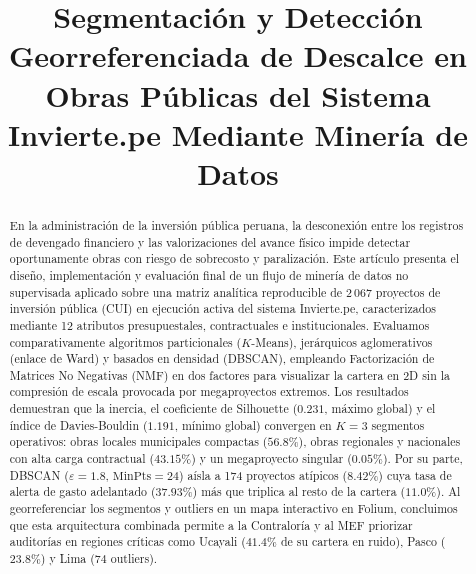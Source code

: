 \documentclass[conference]{IEEEtran}
\begin{document}
\title{Segmentaci\'on y Detecci\'on Georreferenciada de Descalce en Obras P\'ublicas del Sistema Invierte.pe Mediante Miner\'ia de Datos}

\author{
}

\maketitle

\begin{abstract}
En la administraci\'on de la inversi\'on p\'ublica peruana, la desconexi\'on entre los registros de devengado financiero y las valorizaciones del avance f\'isico impide detectar oportunamente obras con riesgo de sobrecosto y paralizaci\'on. Este art\'iculo presenta el dise\~no, implementaci\'on y evaluaci\'on final de un flujo de miner\'ia de datos no supervisada aplicado sobre una matriz anal\'itica reproducible de 2\,067 proyectos de inversi\'on p\'ublica (CUI) en ejecuci\'on activa del sistema Invierte.pe, caracterizados mediante 12 atributos presupuestales, contractuales e institucionales. Evaluamos comparativamente algoritmos particionales ($K$-Means), jer\'arquicos aglomerativos (enlace de Ward) y basados en densidad (DBSCAN), empleando Factorizaci\'on de Matrices No Negativas (NMF) en dos factores para visualizar la cartera en 2D sin la compresi\'on de escala provocada por megaproyectos extremos. Los resultados demuestran que la inercia, el coeficiente de Silhouette ($0.231$, m\'aximo global) y el \'indice de Davies-Bouldin ($1.191$, m\'inimo global) convergen en $K = 3$ segmentos operativos: obras locales municipales compactas ($56.8\%$), obras regionales y nacionales con alta carga contractual ($43.15\%$) y un megaproyecto singular ($0.05\%$). Por su parte, DBSCAN ($\varepsilon = 1.8$, $\text{MinPts} = 24$) a\'isla a 174 proyectos at\'ipicos ($8.42\%$) cuya tasa de alerta de gasto adelantado ($37.93\%$) m\'as que triplica al resto de la cartera ($11.0\%$). Al georreferenciar los segmentos y outliers en un mapa interactivo en Folium, concluimos que esta arquitectura combinada permite a la Contralor\'ia y al MEF priorizar auditor\'ias en regiones cr\'iticas como Ucayali ($41.4\%$ de su cartera en ruido), Pasco ($23.8\%$) y Lima ($74$ outliers).
\end{abstract}
\end{document}
